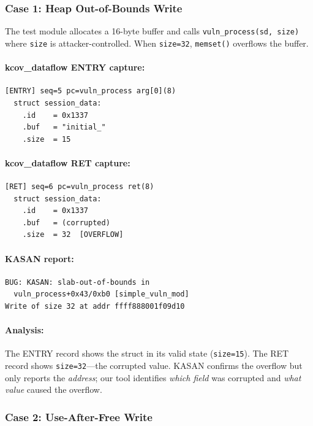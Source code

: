 \documentclass{ndss}
\begin{document}
\subsubsection{Case 1: Heap Out-of-Bounds Write}

The test module allocates a 16-byte buffer and calls
\texttt{vuln\_process(sd, size)} where \texttt{size} is attacker-controlled.
When \texttt{size=32}, \texttt{memset()} overflows the buffer.

\paragraph{kcov\_dataflow ENTRY capture:}
\begin{lstlisting}[numbers=none]
[ENTRY] seq=5 pc=vuln_process arg[0](8)
  struct session_data:
    .id    = 0x1337
    .buf   = "initial_"
    .size  = 15
\end{lstlisting}

\paragraph{kcov\_dataflow RET capture:}
\begin{lstlisting}[numbers=none]
[RET] seq=6 pc=vuln_process ret(8)
  struct session_data:
    .id    = 0x1337
    .buf   = (corrupted)
    .size  = 32  [OVERFLOW]
\end{lstlisting}

\paragraph{KASAN report:}
\begin{lstlisting}[numbers=none]
BUG: KASAN: slab-out-of-bounds in
  vuln_process+0x43/0xb0 [simple_vuln_mod]
Write of size 32 at addr ffff888001f09d10
\end{lstlisting}

\paragraph{Analysis:} The ENTRY record shows the struct in its valid state
(\texttt{size=15}). The RET record shows \texttt{size=32}---the corrupted
value. KASAN confirms the overflow but only reports the \emph{address}; our
tool identifies \emph{which field} was corrupted and \emph{what value} caused
the overflow.

\subsubsection{Case 2: Use-After-Free Write}
\end{document}
